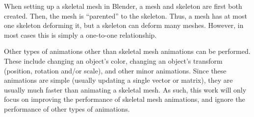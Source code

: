 When setting up a skeletal mesh in Blender, a mesh and skeleton are first both created.
Then, the mesh is ``parented'' to the skeleton.
Thus, a mesh has at most one skeleton deforming it, but a skeleton can deform many meshes.
However, in most cases this is simply a one-to-one relationship.

Other types of animations other than skeletal mesh animations can be performed.
These include changing an object's color, changing an object's transform (position, rotation and/or scale), and other minor animations.
Since these animations are simple (usually updating a single vector or matrix), they are usually much faster than animating a skeletal mesh.
As such, this work will only focus on improving the performance of skeletal mesh animations, and ignore the performance of other types of animations.

%

%
